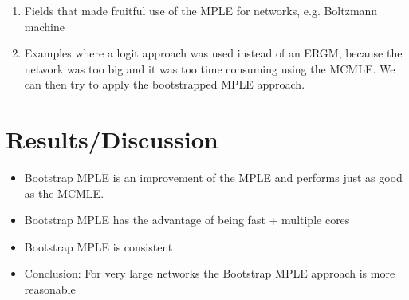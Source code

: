 \documentclass[headsepline=true, abstracton]{scrartcl}
\begin{document}
 \begin{enumerate}
 \item Fields that made fruitful use of the MPLE for networks, e.g. Boltzmann machine
 \item Examples where a logit approach was used instead of an ERGM, because the network was too big and it was too time consuming using the MCMLE. We can then try to apply the bootstrapped MPLE approach.
\end{enumerate}   
   


 \section*{Results/Discussion}
\begin{itemize}
  
 \item  Bootstrap MPLE is an improvement of the MPLE and performs just as good as the MCMLE. \\
\item Bootstrap MPLE has the advantage of being fast + multiple cores\\ 
\item Bootstrap MPLE is consistent\\
\item Conclusion: For very large networks the Bootstrap MPLE approach is more reasonable
   
\end{itemize}

   
\newpage


 

\end{document}
